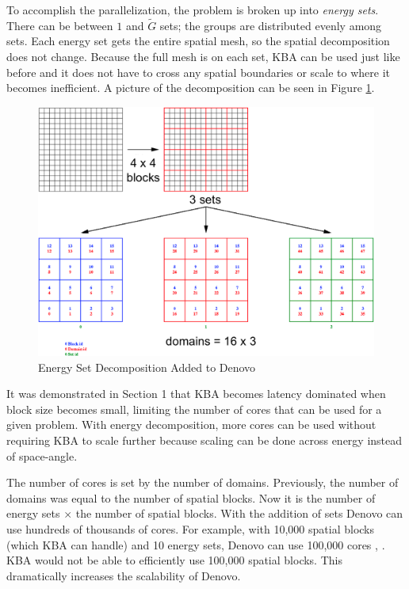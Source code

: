 To accomplish the parallelization, the problem is broken up into \emph{energy sets}. There can be between $1$ and $\tilde{G}$ sets; the groups are distributed evenly among sets. Each energy set gets the entire spatial mesh, so the spatial decomposition does not change. Because the full mesh is on each set, KBA  can be used just like before and it does not have to cross any spatial boundaries or scale to where it becomes inefficient. A picture of the decomposition can be seen in Figure \ref{fig:EnergyDecomp}.
%
\begin{figure}[!h]
  \begin{center}
    \includegraphics [width=.8\textwidth, height=0.45\textheight ] {EnergySets}
  \end{center}
  \caption{Energy Set Decomposition Added to Denovo \cite{Evans2011}}
  \label{fig:EnergyDecomp}
\end{figure}

It was demonstrated in Section 1 that KBA becomes latency dominated when block size becomes small, limiting the number of cores that can be used for a given problem. With energy decomposition, more cores can be used without requiring KBA to scale further because scaling can be done across energy instead of space-angle. 

The number of cores is set by the number of domains. Previously, the number of domains was equal to the number of spatial blocks. Now it is the number of energy sets $\times$ the number of spatial blocks. With the addition of sets Denovo can use hundreds of thousands of cores. For example, with 10,000 spatial blocks (which KBA can handle) and 10 energy sets, Denovo can use 100,000 cores \cite{Evans2011}, \cite{Evans2010}. KBA would not be able to efficiently use 100,000 spatial blocks. This dramatically increases the scalability of Denovo.

